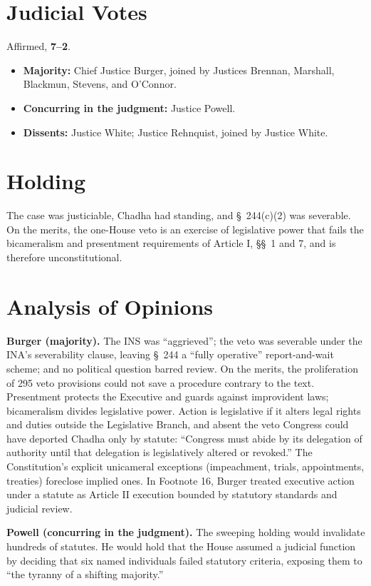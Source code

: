 \documentclass[12pt]{article}
\begin{document}
\section{Judicial Votes}

Affirmed, \textbf{7--2}.
\begin{itemize}
\item \textbf{Majority:} Chief Justice Burger, joined by Justices Brennan, Marshall, Blackmun, Stevens, and O'Connor.
\item \textbf{Concurring in the judgment:} Justice Powell.
\item \textbf{Dissents:} Justice White; Justice Rehnquist, joined by Justice White.
\end{itemize}

\section{Holding}

The case was justiciable, Chadha had standing, and \S~244(c)(2) was severable. On the merits, the one-House veto is an exercise of legislative power that fails the bicameralism and presentment requirements of Article I, \S\S~1 and 7, and is therefore unconstitutional.

\section{Analysis of Opinions}

\textbf{Burger (majority).} The INS was ``aggrieved''; the veto was severable under the INA's severability clause, leaving \S~244 a ``fully operative'' report-and-wait scheme; and no political question barred review. On the merits, the proliferation of 295 veto provisions could not save a procedure contrary to the text. Presentment protects the Executive and guards against improvident laws; bicameralism divides legislative power. Action is legislative if it alters legal rights and duties outside the Legislative Branch, and absent the veto Congress could have deported Chadha only by statute: ``Congress must abide by its delegation of authority until that delegation is legislatively altered or revoked.'' The Constitution's explicit unicameral exceptions (impeachment, trials, appointments, treaties) foreclose implied ones. In Footnote 16, Burger treated executive action under a statute as Article II execution bounded by statutory standards and judicial review.

\textbf{Powell (concurring in the judgment).} The sweeping holding would invalidate hundreds of statutes. He would hold that the House assumed a judicial function by deciding that six named individuals failed statutory criteria, exposing them to ``the tyranny of a shifting majority.''
\end{document}
